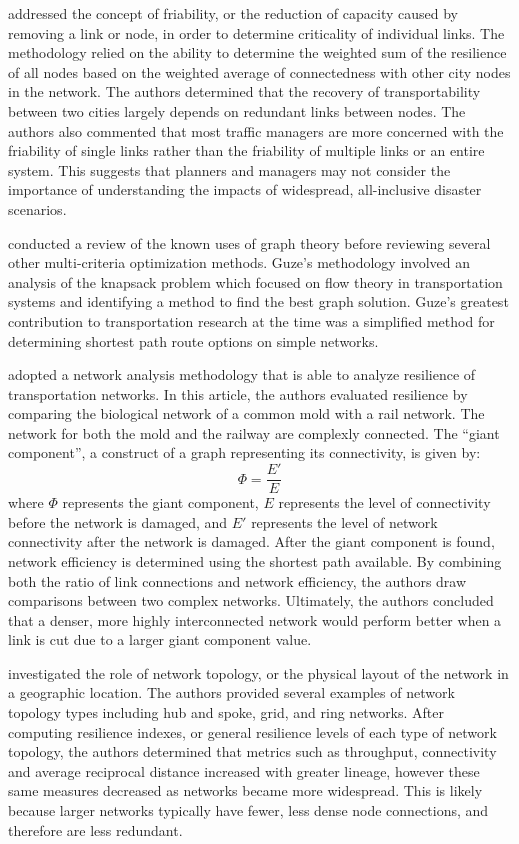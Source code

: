 \citet{ip2011} addressed the concept of {friability}, or
the reduction of capacity caused by removing a link or node, in order to
determine criticality of individual links. The methodology relied on the
ability
to determine the weighted sum of the resilience of all nodes based on the
weighted average of connectedness with other city nodes in the network. The
authors determined that the recovery of transportability between two cities
largely depends on redundant links between nodes. The authors also commented
that
most traffic managers are more concerned with the friability of single
links
rather than the friability of multiple links or an entire system. This suggests
that planners and managers may not consider the importance of
understanding the impacts of widespread, all-inclusive disaster scenarios.

\citet{guze2014} conducted a review of the known uses of graph theory before
reviewing several other multi-criteria optimization methods.
Guze’s methodology involved an
analysis of the knapsack problem which focused on flow theory in transportation
systems and identifying a method to find the best graph solution. Guze’s
greatest contribution to transportation research
at the time was a simplified method
for determining shortest path route options on simple networks.

\citet{osei2014} adopted a network analysis methodology that is able to
analyze
resilience of transportation networks. In this
article, the authors evaluated resilience by comparing the biological
network of a common mold
with a rail network. The network for both the mold and the railway are
complexly connected. The ``giant component'', a construct of a graph representing its connectivity, is given by:
\begin{equation}
	\Phi = \frac{E'}{ E}
\end{equation}
where $\Phi$ represents the giant component, $E$ represents the
level of connectivity before the network is damaged, and $E'$ represents the
level of network connectivity after the network is damaged. After the giant component
is found, network efficiency is determined using the
shortest path available. By combining both the ratio of link connections and
network efficiency, the authors draw comparisons between two
complex networks. Ultimately, the authors concluded that a denser, more highly
interconnected network would perform better when a link is cut due to a larger giant component value.

\citet{zhang2015} investigated the role of network topology, or the physical
layout of the network in a geographic location.
The authors provided several examples of network topology types including
hub and spoke, grid, and
ring networks. After computing resilience indexes, or general resilience
levels of each type of
network topology, the authors determined that metrics such as throughput,
connectivity and average
reciprocal distance increased with greater lineage, however these same measures decreased as
networks became
more widespread. This is likely because larger networks typically have fewer, less dense node
connections, and
therefore are less redundant.


